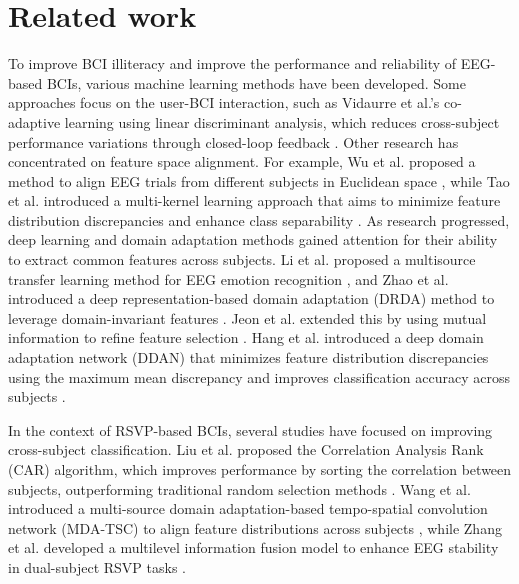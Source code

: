 \section{Related work}
To improve BCI illiteracy and improve the performance and reliability of EEG-based BCIs, various machine learning methods have been developed. Some approaches focus on the user-BCI interaction, such as Vidaurre et al.'s co-adaptive learning using linear discriminant analysis, which reduces cross-subject performance variations through closed-loop feedback \cite{vidaurre2010towards}. Other research has concentrated on feature space alignment. For example, Wu et al. proposed a method to align EEG trials from different subjects in Euclidean space \cite{he2019transfer}, while Tao et al. introduced a multi-kernel learning approach that aims to minimize feature distribution discrepancies and enhance class separability \cite{tao2022distribution}. As research progressed, deep learning and domain adaptation methods gained attention for their ability to extract common features across subjects. Li et al. proposed a multisource transfer learning method for EEG emotion recognition \cite{li2019multisource}, and Zhao et al. introduced a deep representation-based domain adaptation (DRDA) method to leverage domain-invariant features \cite{zhao2020deep}. Jeon et al. extended this by using mutual information to refine feature selection \cite{jeon2021mutual}. Hang et al. introduced a deep domain adaptation network (DDAN) that minimizes feature distribution discrepancies using the maximum mean discrepancy and improves classification accuracy across subjects \cite{hang2019cross}.

In the context of RSVP-based BCIs, several studies have focused on improving cross-subject classification. Liu et al. proposed the Correlation Analysis Rank (CAR) algorithm, which improves performance by sorting the correlation between subjects, outperforming traditional random selection methods \cite{liu2020improving}. Wang et al. introduced a multi-source domain adaptation-based tempo-spatial convolution network (MDA-TSC) to align feature distributions across subjects \cite{wang2024multi}, while Zhang et al. developed a multilevel information fusion model to enhance EEG stability in dual-subject RSVP tasks \cite{zhang2021two}.

